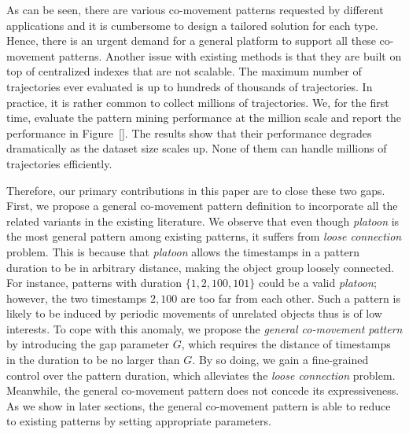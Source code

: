


As can be seen, there are various co-movement patterns requested by different applications and it is cumbersome to design a tailored solution for each type. Hence, there is an urgent demand for a general platform to support all these co-movement patterns. Another issue with existing methods is that they are built on top of centralized indexes that are not scalable. The maximum number of trajectories ever evaluated is up to hundreds of thousands of trajectories. In practice, it is rather common to collect millions of trajectories. We, for the first time, evaluate the pattern mining performance at the million scale and report the performance in Figure~\ref{}. The results show that their performance degrades dramatically as the dataset size scales up. None of them can handle millions of trajectories efficiently. 

Therefore, our primary contributions in this paper are to close these two gaps. First, we propose a general co-movement pattern definition to incorporate all the related variants in the existing literature. We observe that even though \emph{platoon} is the most general pattern among existing patterns, it suffers from \emph{loose connection} problem. This is because that \emph{platoon} allows the timestamps in a pattern duration to be in arbitrary distance, making the object group loosely
connected. For instance, patterns with duration $\{1,2,100,101\}$ could be a valid \emph{platoon}; however, the two timestamps $2,100$ are too far from each other. Such a pattern is likely to be induced by periodic movements of unrelated objects thus is of low interests. To cope with this anomaly, we propose the \emph{general co-movement pattern} by introducing the gap parameter $G$, which requires the distance of timestamps in the duration to be no larger than $G$. By so doing, we gain a fine-grained control over the pattern duration, which alleviates the \emph{loose connection} problem. Meanwhile, the general co-movement pattern does not concede its expressiveness. As we show in later sections, the general co-movement pattern is able to reduce to existing patterns by setting appropriate parameters.

